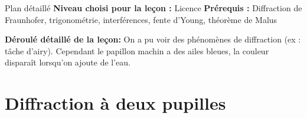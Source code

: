 \begin{reportBlock}{Plan détaillé}
  \textbf{Niveau choisi pour la leçon :} Licence
  \newline
  \textbf{Prérequis : }Diffraction de Fraunhofer, trigonométrie, interférences, fente d'Young, théorème de Malus
  \newline
  
  \textbf{Déroulé détaillé de la leçon: }   \newline
On a pu voir des phénomènes de diffraction (ex : tâche d'airy). Cependant le papillon machin a des ailes bleues, la couleur disparaît lorsqu'on ajoute de l'eau.
  \section{Diffraction à deux pupilles}

\end{reportBlock}
